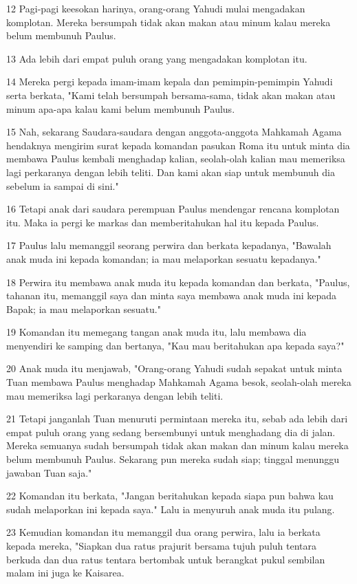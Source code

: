 \par 12 Pagi-pagi keesokan harinya, orang-orang Yahudi mulai mengadakan komplotan. Mereka bersumpah tidak akan makan atau minum kalau mereka belum membunuh Paulus.
\par 13 Ada lebih dari empat puluh orang yang mengadakan komplotan itu.
\par 14 Mereka pergi kepada imam-imam kepala dan pemimpin-pemimpin Yahudi serta berkata, "Kami telah bersumpah bersama-sama, tidak akan makan atau minum apa-apa kalau kami belum membunuh Paulus.
\par 15 Nah, sekarang Saudara-saudara dengan anggota-anggota Mahkamah Agama hendaknya mengirim surat kepada komandan pasukan Roma itu untuk minta dia membawa Paulus kembali menghadap kalian, seolah-olah kalian mau memeriksa lagi perkaranya dengan lebih teliti. Dan kami akan siap untuk membunuh dia sebelum ia sampai di sini."
\par 16 Tetapi anak dari saudara perempuan Paulus mendengar rencana komplotan itu. Maka ia pergi ke markas dan memberitahukan hal itu kepada Paulus.
\par 17 Paulus lalu memanggil seorang perwira dan berkata kepadanya, "Bawalah anak muda ini kepada komandan; ia mau melaporkan sesuatu kepadanya."
\par 18 Perwira itu membawa anak muda itu kepada komandan dan berkata, "Paulus, tahanan itu, memanggil saya dan minta saya membawa anak muda ini kepada Bapak; ia mau melaporkan sesuatu."
\par 19 Komandan itu memegang tangan anak muda itu, lalu membawa dia menyendiri ke samping dan bertanya, "Kau mau beritahukan apa kepada saya?"
\par 20 Anak muda itu menjawab, "Orang-orang Yahudi sudah sepakat untuk minta Tuan membawa Paulus menghadap Mahkamah Agama besok, seolah-olah mereka mau memeriksa lagi perkaranya dengan lebih teliti.
\par 21 Tetapi janganlah Tuan menuruti permintaan mereka itu, sebab ada lebih dari empat puluh orang yang sedang bersembunyi untuk menghadang dia di jalan. Mereka semuanya sudah bersumpah tidak akan makan dan minum kalau mereka belum membunuh Paulus. Sekarang pun mereka sudah siap; tinggal menunggu jawaban Tuan saja."
\par 22 Komandan itu berkata, "Jangan beritahukan kepada siapa pun bahwa kau sudah melaporkan ini kepada saya." Lalu ia menyuruh anak muda itu pulang.
\par 23 Kemudian komandan itu memanggil dua orang perwira, lalu ia berkata kepada mereka, "Siapkan dua ratus prajurit bersama tujuh puluh tentara berkuda dan dua ratus tentara bertombak untuk berangkat pukul sembilan malam ini juga ke Kaisarea.
